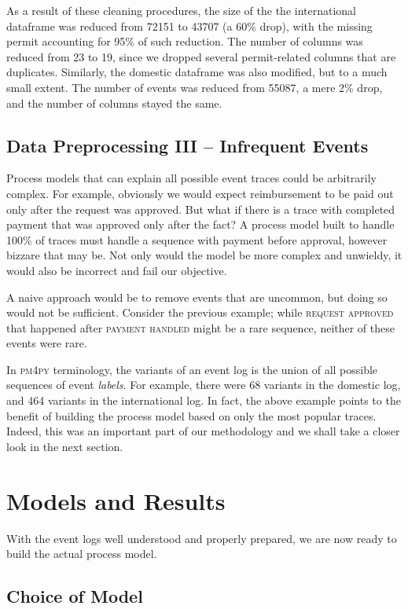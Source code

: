 \documentclass[conference]{IEEEtran}
\begin{document}
As a result of these cleaning procedures, the size of the
the international dataframe was reduced from 72151 to 43707 (a 60\% drop),
with the
missing permit accounting for 95\% of such reduction. The number of
columns was reduced from 23 to 19, since we dropped
several permit-related columns that are duplicates.
Similarly, the domestic dataframe was also modified, but to a much small extent.
The number of events was reduced from 55087, a mere 2\% drop, and the
number of columns stayed the same.

\subsection{Data Preprocessing III -- Infrequent Events}

Process models that can explain all possible event traces could be
arbitrarily complex. For example, obviously we would expect reimbursement to
be paid out only after the request was approved. But what if there is
a trace with completed payment that was approved only after the fact?
A process model
built to handle 100\% of traces must handle a sequence with
payment before approval, however bizzare that may be.
Not only would the model be more complex and unwieldy,
it would also be incorrect and fail our objective.

A naive approach would be to remove events that are uncommon, but doing so
would not be sufficient. Consider the previous example;
while \textsc{request approved} that happened after \textsc{payment handled}
might be a rare sequence, neither of these events were rare.

In \textsc{pm4py} terminology, the variants of an event log is the
union of all possible sequences of event \textit{labels}.
For example, there were
68 variants in the domestic log, and 464 variants in the international log.
In fact, the above example
points to the benefit of building the process model based on
only the most popular traces.  Indeed, this was an important part of our
methodology and we shall take a closer look in the next section.

\section{Models and Results}
\label{section-models}


With the event logs well understood and properly prepared, we are now
ready to build the actual process model.

\subsection{Choice of Model}
\end{document}
